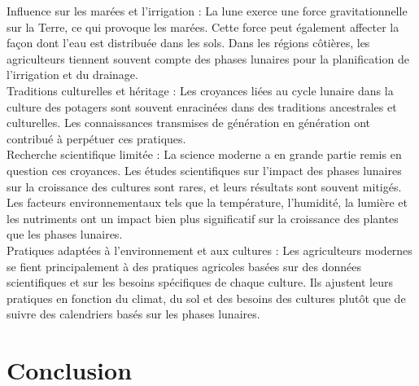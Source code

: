 Influence sur les marées et l'irrigation : La lune exerce une force gravitationnelle sur la Terre, ce qui provoque les marées. Cette force peut également affecter la façon dont l'eau est distribuée dans les sols. Dans les régions côtières, les agriculteurs tiennent souvent compte des phases lunaires pour la planification de l'irrigation et du drainage.\\

Traditions culturelles et héritage : Les croyances liées au cycle lunaire dans la culture des potagers sont souvent enracinées dans des traditions ancestrales et culturelles. Les connaissances transmises de génération en génération ont contribué à perpétuer ces pratiques.\\

Recherche scientifique limitée : La science moderne a en grande partie remis en question ces croyances. Les études scientifiques sur l'impact des phases lunaires sur la croissance des cultures sont rares, et leurs résultats sont souvent mitigés. Les facteurs environnementaux tels que la température, l'humidité, la lumière et les nutriments ont un impact bien plus significatif sur la croissance des plantes que les phases lunaires.\\

Pratiques adaptées à l'environnement et aux cultures : Les agriculteurs modernes se fient principalement à des pratiques agricoles basées sur des données scientifiques et sur les besoins spécifiques de chaque culture. Ils ajustent leurs pratiques en fonction du climat, du sol et des besoins des cultures plutôt que de suivre des calendriers basés sur les phases lunaires.\\

\section{Conclusion}


